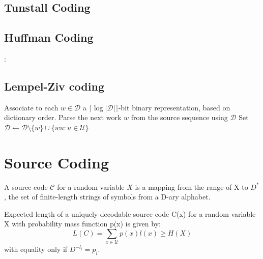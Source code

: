 \documentclass[10pt,a4paper,landscape]{article}
\newcommand{\code}{\mathcal{C}}
\newcommand{\alphabet}{\mathcal{U}}
\begin{document}
\begin{multicols*}{4}
\subsection{Tunstall Coding}

\begin{algorithmic}[1]
\EndWhile
\end{algorithmic}

\subsection{Huffman Coding}

\begin{algorithmic}[1]
:
\EndWhile
{}
\end{algorithmic}

\subsection{Lempel-Ziv coding}
\begin{algorithmic}[1]
	\State {Set $\mathcal D = \alphabet$}
	\Loop
		\State Associate to each $w \in \mathcal D$ a $\lceil \log | \mathcal D | \rceil$-bit binary representation, based on dictionary order.
		\State Parse the next work $w$ from the source sequence using $\mathcal D$
		\State Set $\mathcal D \gets \mathcal D \setminus \{w\} \cup \{ w u: u \in \alphabet \}$
	\EndLoop
\end{algorithmic}

\section{Source Coding}
A source code $\code$ for a random variable $X$ is a mapping from the range of X to $D^*$, the set of finite-length strings of symbols from a D-ary alphabet.

Expected length of a uniquely decodable source code C(x) for a random variable X with probability mass function p(x) is given by:
$$L(C) = \sum_{x \in \alphabet} p(x) l(x) \geq H(X)$$
with equality only if $D^{-l_i} = p_i$.


\end{multicols*}
\end{document}
